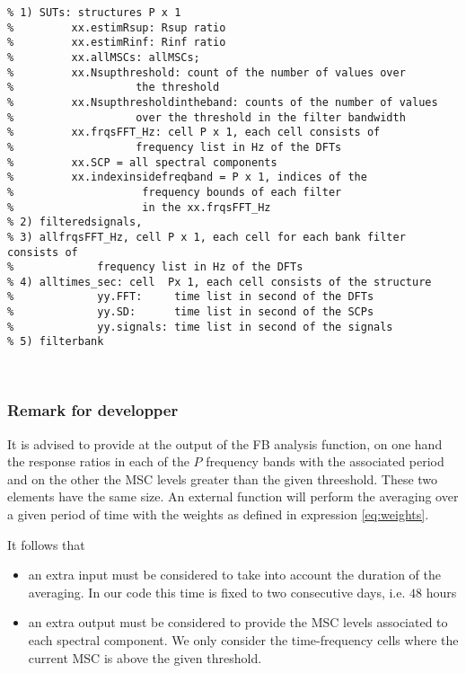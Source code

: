 \begin{verbatim}
% 1) SUTs: structures P x 1
%         xx.estimRsup: Rsup ratio
%         xx.estimRinf: Rinf ratio
%         xx.allMSCs: allMSCs;
%         xx.Nsupthreshold: count of the number of values over
%                   the threshold
%         xx.Nsupthresholdintheband: counts of the number of values
%                   over the threshold in the filter bandwidth
%         xx.frqsFFT_Hz: cell P x 1, each cell consists of
%                   frequency list in Hz of the DFTs
%         xx.SCP = all spectral components
%         xx.indexinsidefreqband = P x 1, indices of the
%                    frequency bounds of each filter
%                    in the xx.frqsFFT_Hz
% 2) filteredsignals, 
% 3) allfrqsFFT_Hz, cell P x 1, each cell for each bank filter consists of
%             frequency list in Hz of the DFTs
% 4) alltimes_sec: cell  Px 1, each cell consists of the structure
%             yy.FFT:     time list in second of the DFTs
%             yy.SD:      time list in second of the SCPs
%             yy.signals: time list in second of the signals
% 5) filterbank



\end{verbatim}


\subsubsection{Remark for developper}

It is advised to provide at the output of the FB analysis function, on one hand the response ratios in each of the $P$ frequency bands  with the associated period and on the other the MSC levels greater than the given threeshold. These two elements have the same size. An external function will perform the averaging over a given period of time with the weights as defined in expression \ref{eq:weights}.

It follows that 
\begin{itemize}
\item
 an extra input must be considered to take into account the duration of the averaging. In our code this time is fixed to two consecutive days, i.e. $48$ hours
\item
 an extra output must be considered to provide the MSC levels associated to each spectral component. We only consider the time-frequency cells where the current MSC is above the given threshold.

\end{itemize}

